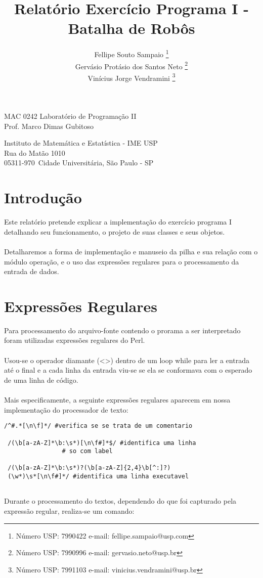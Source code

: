 \documentclass[a4paper]{article}
\title{Relatório Exercício Programa I - Batalha de Robôs}
\author{
Fellipe Souto Sampaio \footnote{Número USP: 7990422 e-mail: fellipe.sampaio@usp.com}\\
Gervásio Protásio dos Santos Neto \footnote{Número USP: 7990996 e-mail: gervasio.neto@usp.br}\\
Vinícius Jorge Vendramini \footnote{Número USP: 7991103 e-mail: vinicius.vendramini@usp.br}
}
\begin{document}
\maketitle

\begin{center}
MAC 0242 Laboratório de Programa\c{c}ão II \\
Prof. Marco Dimas Gubitoso \\
             
\end{center}

\begin{center}
Instituto de Matemática e Estatística - IME USP \\
 Rua do Matão 1010 \\
 05311-970\, Cidade Universitária, São Paulo - SP \\
\end{center}

\newpage

\section{Introdução}
Este relatório pretende explicar a implementação do exercício programa I detalhando seu funcionamento, o projeto de suas classes e seus objetos.\\\\
Detalharemos a forma de implementação e manuseio da pilha e sua relação com o módulo operação, e o uso das expressões regulares para o processamento da entrada de dados.

\section{Expressões Regulares}

Para processamento do arquivo-fonte contendo o prorama a ser interpretado foram utilizadas expressões regulares do Perl.\\\\
Usou-se o operador diamante (<>) dentro de um loop while para ler a entrada até o final e a cada linha da entrada viu-se se ela se conformava com o esperado de uma linha de código.\\\\
Mais especificamente, a seguinte expressões regulares aparecem em nossa implementação do processador de texto:
\begin{lstlisting}[frame=single]
 /^#.*[\n\f]*/ #verifica se se trata de um comentario
 
 /(\b[a-zA-Z]*\b:\s*)[\n\f#]*$/ #identifica uma linha
				# so com label
                
 /(\b[a-zA-Z]*\b:\s*)?(\b[a-zA-Z]{2,4}\b[^:]?)
 (\w*)\s*[\n\f#]*/ #identifica uma linha executavel
 

\end{lstlisting}
Durante o processamento do textos, dependendo do que foi capturado pela expressão regular, realiza-se um comando:
\end{document}
